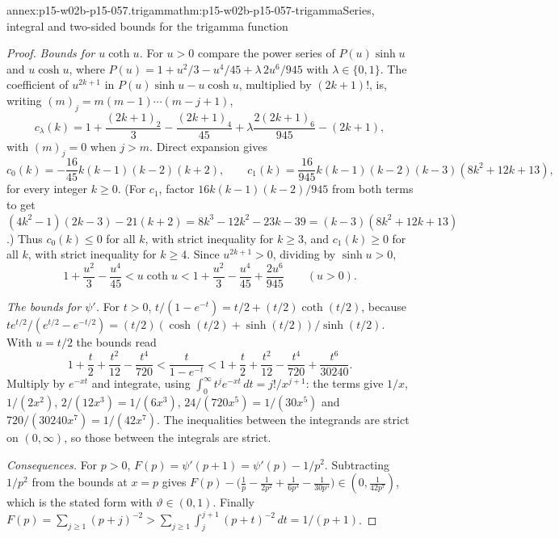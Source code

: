 \begin{annexitem}{annex:p15-w02b-p15-057.trigamma}{thm:p15-w02b-p15-057-trigamma}{Series, integral and two-sided bounds for the trigamma function}
\begin{proof}
\emph{Bounds for \(u\coth u\).} For \(u>0\) compare the power series of
\(P(u)\sinh u\) and \(u\cosh u\), where
\(P(u)=1+u^2/3-u^4/45+\lambda\,2u^6/945\) with \(\lambda\in\{0,1\}\). The
coefficient of \(u^{2k+1}\) in \(P(u)\sinh u-u\cosh u\), multiplied by
\((2k+1)!\), is, writing \((m)_j=m(m-1)\cdots(m-j+1)\),
\[
 c_\lambda(k)=1+\frac{(2k+1)_2}3-\frac{(2k+1)_4}{45}
 +\lambda\frac{2(2k+1)_6}{945}-(2k+1),
\]
with \((m)_j=0\) when \(j>m\). Direct expansion gives
\[
 c_0(k)=-\frac{16}{45}k(k-1)(k-2)(k+2),\qquad
 c_1(k)=\frac{16}{945}k(k-1)(k-2)(k-3)(8k^2+12k+13),
\]
for every integer \(k\geq0\). (For \(c_1\), factor
\(16k(k-1)(k-2)/945\) from both terms to get
\((4k^2-1)(2k-3)-21(k+2)=8k^3-12k^2-23k-39=(k-3)(8k^2+12k+13)\).) Thus
\(c_0(k)\leq0\) for all \(k\), with strict inequality for \(k\geq3\), and
\(c_1(k)\geq0\) for all \(k\), with strict inequality for \(k\geq4\). Since
\(u^{2k+1}>0\), dividing by \(\sinh u>0\),
\[
 1+\frac{u^2}3-\frac{u^4}{45}<u\coth u<1+\frac{u^2}3-\frac{u^4}{45}
 +\frac{2u^6}{945}\qquad(u>0).
\]

\emph{The bounds for \(\psi'\).} For \(t>0\),
\(t/(1-e^{-t})=t/2+(t/2)\coth(t/2)\), because
\(te^{t/2}/(e^{t/2}-e^{-t/2})=(t/2)(\cosh(t/2)+\sinh(t/2))/\sinh(t/2)\).
With \(u=t/2\) the bounds read
\[
 1+\frac t2+\frac{t^2}{12}-\frac{t^4}{720}<\frac t{1-e^{-t}}<
 1+\frac t2+\frac{t^2}{12}-\frac{t^4}{720}+\frac{t^6}{30240}.
\]
Multiply by \(e^{-xt}\) and integrate, using
\(\int_0^\infty t^je^{-xt}\,dt=j!/x^{j+1}\): the terms give \(1/x\),
\(1/(2x^2)\), \(2/(12x^3)=1/(6x^3)\), \(24/(720x^5)=1/(30x^5)\) and
\(720/(30240x^7)=1/(42x^7)\). The inequalities between the integrands are
strict on \((0,\infty)\), so those between the integrals are strict.

\emph{Consequences.} For \(p>0\),
\(F(p)=\psi'(p+1)=\psi'(p)-1/p^2\). Subtracting \(1/p^2\) from the bounds at
\(x=p\) gives
\(F(p)-\bigl(\frac1p-\frac1{2p^2}+\frac1{6p^3}-\frac1{30p^5}\bigr)\in
(0,\frac1{42p^7})\), which is the stated form with
\(\vartheta\in(0,1)\). Finally
\(F(p)=\sum_{j\geq1}(p+j)^{-2}>\sum_{j\geq1}\int_j^{j+1}(p+t)^{-2}\,dt
=1/(p+1)\).
\end{proof}
\end{annexitem}

